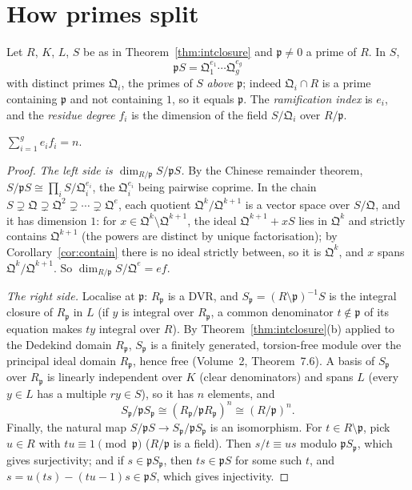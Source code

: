 \section{How primes split}

Let $R$, $K$, $L$, $S$ be as in Theorem~\ref{thm:intclosure} and $\mathfrak p\ne0$ a prime of $R$. In $S$,
\[
\mathfrak pS=\mathfrak Q_1^{e_1}\cdots\mathfrak Q_g^{e_g}
\]
with distinct primes $\mathfrak Q_i$, the primes of $S$ \emph{above} $\mathfrak p$; indeed $\mathfrak Q_i\cap R$ is a prime containing $\mathfrak p$ and not containing $1$, so it equals $\mathfrak p$. The \emph{ramification index} is $e_i$, and
the \emph{residue degree} $f_i$ is the dimension of the field $S/\mathfrak Q_i$ over $R/\mathfrak p$.

\begin{theorem}\label{thm:fundid}
$\displaystyle\sum_{i=1}^ge_if_i=n$.
\end{theorem}

\begin{proof}
\emph{The left side is $\dim_{R/\mathfrak p}S/\mathfrak pS$.} By the Chinese remainder theorem, $S/\mathfrak pS\cong\prod_iS/\mathfrak Q_i^{e_i}$, the $\mathfrak Q_i^{e_i}$ being pairwise coprime. In the chain
$S\supsetneq\mathfrak Q\supsetneq\mathfrak Q^2\supsetneq\cdots\supsetneq\mathfrak Q^e$, each quotient $\mathfrak Q^k/\mathfrak Q^{k+1}$ is a vector space over $S/\mathfrak Q$, and it has dimension $1$: for $x\in\mathfrak Q^k\setminus\mathfrak Q^{k+1}$,
the ideal $\mathfrak Q^{k+1}+xS$ lies in $\mathfrak Q^k$ and strictly contains $\mathfrak Q^{k+1}$ (the powers are distinct by unique factorisation); by Corollary~\ref{cor:contain} there is no ideal strictly between, so it is $\mathfrak Q^k$, and $x$ spans $\mathfrak Q^k/\mathfrak Q^{k+1}$. So $\dim_{R/\mathfrak p}S/\mathfrak Q^e=ef$.

\emph{The right side.} Localise at $\mathfrak p$: $R_{\mathfrak p}$ is a DVR, and $S_{\mathfrak p}=(R\setminus\mathfrak p)^{-1}S$ is the integral closure of $R_{\mathfrak p}$ in $L$ (if $y$ is integral over $R_{\mathfrak p}$, a common denominator
$t\notin\mathfrak p$ of its equation makes $ty$ integral over $R$). By Theorem~\ref{thm:intclosure}(b) applied to the Dedekind domain $R_{\mathfrak p}$, $S_{\mathfrak p}$ is a finitely generated, torsion-free module over the
principal ideal domain $R_{\mathfrak p}$, hence free (Volume~2, Theorem~7.6). A basis of $S_{\mathfrak p}$ over $R_{\mathfrak p}$ is linearly independent over $K$ (clear denominators) and spans $L$ (every $y\in L$ has a multiple $ry\in S$),
so it has $n$ elements, and
\[
S_{\mathfrak p}/\mathfrak pS_{\mathfrak p}\cong(R_{\mathfrak p}/\mathfrak pR_{\mathfrak p})^n\cong(R/\mathfrak p)^n.
\]
Finally, the natural map $S/\mathfrak pS\to S_{\mathfrak p}/\mathfrak pS_{\mathfrak p}$ is an isomorphism. For $t\in R\setminus\mathfrak p$, pick $u\in R$ with $tu\equiv1\pmod{\mathfrak p}$ ($R/\mathfrak p$ is a field). Then $s/t\equiv us$
modulo $\mathfrak pS_{\mathfrak p}$, which gives surjectivity; and if $s\in\mathfrak pS_{\mathfrak p}$, then $ts\in\mathfrak pS$ for some such $t$, and $s=u(ts)-(tu-1)s\in\mathfrak pS$, which gives injectivity.
\end{proof}

